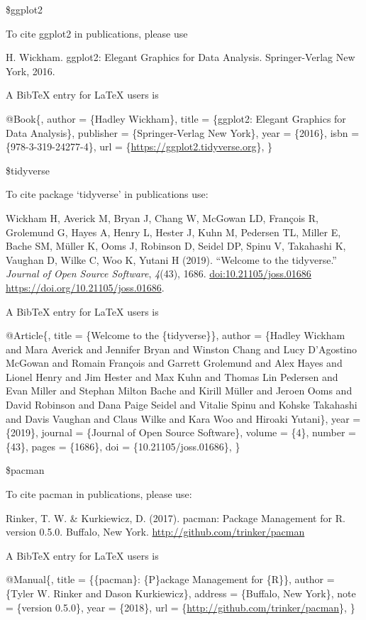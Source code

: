 \documentclass[
]{article}
\begin{document}
\$ggplot2

To cite ggplot2 in publications, please use

H. Wickham. ggplot2: Elegant Graphics for Data Analysis. Springer-Verlag
New York, 2016.

A BibTeX entry for LaTeX users is

@Book\{, author = \{Hadley Wickham\}, title = \{ggplot2: Elegant
Graphics for Data Analysis\}, publisher = \{Springer-Verlag New York\},
year = \{2016\}, isbn = \{978-3-319-24277-4\}, url =
\{\url{https://ggplot2.tidyverse.org}\}, \}

\$tidyverse

To cite package `tidyverse' in publications use:

Wickham H, Averick M, Bryan J, Chang W, McGowan LD, François R,
Grolemund G, Hayes A, Henry L, Hester J, Kuhn M, Pedersen TL, Miller E,
Bache SM, Müller K, Ooms J, Robinson D, Seidel DP, Spinu V, Takahashi K,
Vaughan D, Wilke C, Woo K, Yutani H (2019). ``Welcome to the
tidyverse.'' \emph{Journal of Open Source Software}, \emph{4}(43), 1686.
\url{doi:10.21105/joss.01686} \url{https://doi.org/10.21105/joss.01686}.

A BibTeX entry for LaTeX users is

@Article\{, title = \{Welcome to the \{tidyverse\}\}, author = \{Hadley
Wickham and Mara Averick and Jennifer Bryan and Winston Chang and Lucy
D'Agostino McGowan and Romain François and Garrett Grolemund and Alex
Hayes and Lionel Henry and Jim Hester and Max Kuhn and Thomas Lin
Pedersen and Evan Miller and Stephan Milton Bache and Kirill Müller and
Jeroen Ooms and David Robinson and Dana Paige Seidel and Vitalie Spinu
and Kohske Takahashi and Davis Vaughan and Claus Wilke and Kara Woo and
Hiroaki Yutani\}, year = \{2019\}, journal = \{Journal of Open Source
Software\}, volume = \{4\}, number = \{43\}, pages = \{1686\}, doi =
\{10.21105/joss.01686\}, \}

\$pacman

To cite pacman in publications, please use:

Rinker, T. W. \& Kurkiewicz, D. (2017). pacman: Package Management for
R. version 0.5.0. Buffalo, New York.
\url{http://github.com/trinker/pacman}

A BibTeX entry for LaTeX users is

@Manual\{, title = \{\{pacman\}: \{P\}ackage Management for \{R\}\},
author = \{Tyler W. Rinker and Dason Kurkiewicz\}, address = \{Buffalo,
New York\}, note = \{version 0.5.0\}, year = \{2018\}, url =
\{\url{http://github.com/trinker/pacman}\}, \}
\end{document}
